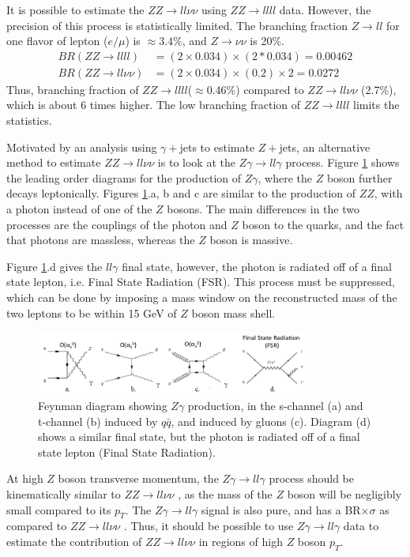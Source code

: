 \documentclass[11pt,a4paper,openright,twoside]{report}
\newcommand{\ZZ}{$ZZ\to ll\nu\nu$ }
\newcommand{\Zg}{$Z\gamma\to ll\gamma$ }
\begin{document}
It is possible to estimate the \ZZ using $ZZ\to llll$ data. However, the precision of this process is statistically limited. The branching fraction $Z\to ll$ for one flavor of lepton ($e/\mu$) is $\approx 3.4\%$, and $Z\to\nu\nu$ is 20\%. 
\begin{align}
BR(ZZ\to llll) &= (2\times 0.034)\times(2*0.034) = 0.00462\\
BR(ZZ\to ll\nu\nu) &= (2\times 0.034)\times(0.2)\times 2 = 0.0272
\end{align}
Thus, branching fraction of $ZZ\to llll$($\approx$0.46\%) compared to \ZZ (2.7\%), which is about 6 times higher. The low branching fraction of $ZZ\to llll$ limits the statistics.

Motivated by an analysis using $\gamma+$jets to estimate $Z+$jets\cite{gamma_jet}, an alternative method to estimate \ZZ is to look at the \Zg process. Figure \ref{fig:Zg} shows the leading order diagrams for the production of $Z\gamma$, where the $Z$ boson further decays leptonically. Figures \ref{fig:Zg}.a, b and c are similar to the production of $ZZ$, with a photon instead of one of the $Z$ bosons. The main differences in the two processes are the couplings of the photon and $Z$ boson to the quarks, and the fact that photons are massless, whereas the $Z$ boson is massive. 

Figure \ref{fig:Zg}.d gives the $ll\gamma$ final state, however, the photon is radiated off of a final state lepton, i.e. Final State Radiation (FSR). This process must be suppressed, which can be done by imposing a mass window on the reconstructed mass of the two leptons to be within 15 GeV of $Z$ boson mass shell.

\begin{figure}[H]
\centering
		\includegraphics[width=0.8\textwidth]{Zg.png}
		\caption{Feynman diagram showing $Z\gamma$ production, in the s-channel (a) and t-channel (b) induced by $q\bar{q}$, and induced by gluons (c). Diagram (d) shows a similar final state, but the photon is radiated off of a final state lepton (Final State Radiation).}
		\label{fig:Zg}
\end{figure}

At high $Z $ boson transverse momentum, the \Zg process should be kinematically similar to \ZZ, as the mass of the $Z$ boson will be negligibly small compared to its $p_T$. The \Zg signal is also pure, and has a BR$\times\sigma$ as compared to \ZZ. Thus, it should be possible to use \Zg data to estimate the contribution of \ZZ in regions of high $Z$ boson $p_T$.
\end{document}
